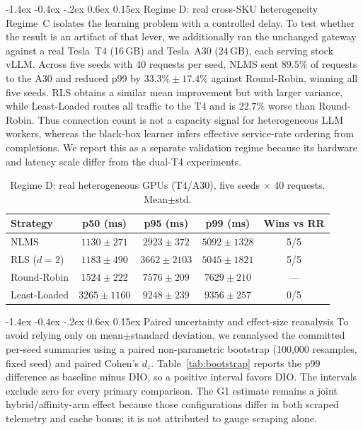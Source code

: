 \documentclass[pdflatex,sn-mathphys-num]{sn-jnl}
\makeatletter
\renewcommand{\subsection}{\@startsection{subsection}{2}{\z@}%
  {-1.4ex \@plus -0.4ex \@minus -.2ex}%
  {0.6ex \@plus 0.15ex}%
  {\needspace{3.5\baselineskip}\normalfont\normalsize\bfseries}}%
\makeatother
\begin{document}
\subsection{Regime D: real cross-SKU heterogeneity}
\label{sec:regimeD}
Regime~C isolates the learning problem with a controlled delay. To test whether
the result is an artifact of that lever, we additionally ran the unchanged gateway
against a real Tesla~T4 (16\,GB) and Tesla~A30 (24\,GB), each serving stock vLLM.
Across five seeds with 40 requests per seed, NLMS sent $89.5\%$ of requests to the
A30 and reduced p99 by $33.3\%\pm17.4\%$ against Round-Robin, winning all five
seeds. RLS obtains a similar mean improvement but with larger variance, while
Least-Loaded routes all traffic to the T4 and is $22.7\%$ worse than Round-Robin.
Thus connection count is not a capacity signal for heterogeneous LLM workers,
whereas the black-box learner infers effective service-rate ordering from
completions. We report this as a separate validation regime because its hardware
and latency scale differ from the dual-T4 experiments.

\begin{table}[ht]
\caption{Regime D: real heterogeneous GPUs (T4/A30), five seeds $\times$ 40 requests. Mean$\pm$std.}
\label{tab:realD}
\centering
\footnotesize
\begin{tabular}{@{}lcccc@{}}
\toprule
Strategy & p50 (ms) & p95 (ms) & p99 (ms) & Wins vs RR \\
\midrule
NLMS & $1130\pm271$ & $2923\pm372$ & $5092\pm1328$ & 5/5 \\
RLS ($d{=}2$) & $1183\pm490$ & $3662\pm2103$ & $5045\pm1821$ & 5/5 \\
Round-Robin & $1524\pm222$ & $7576\pm209$ & $7629\pm210$ & --- \\
Least-Loaded & $3265\pm1160$ & $9248\pm239$ & $9356\pm257$ & 0/5 \\
\bottomrule
\end{tabular}
\end{table}

\subsection{Paired uncertainty and effect-size reanalysis}
To avoid relying only on mean$\pm$standard deviation, we reanalysed the committed
per-seed summaries using a paired non-parametric bootstrap (100,000 resamples,
fixed seed) and paired Cohen's $d_z$. Table~\ref{tab:bootstrap} reports the p99
difference as baseline minus DIO, so a positive interval favors DIO. The intervals
exclude zero for every primary comparison. The G1 estimate remains a joint
hybrid/affinity-arm effect because those configurations differ in both scraped
telemetry and cache bonus; it is not attributed to gauge scraping alone.
\end{document}
